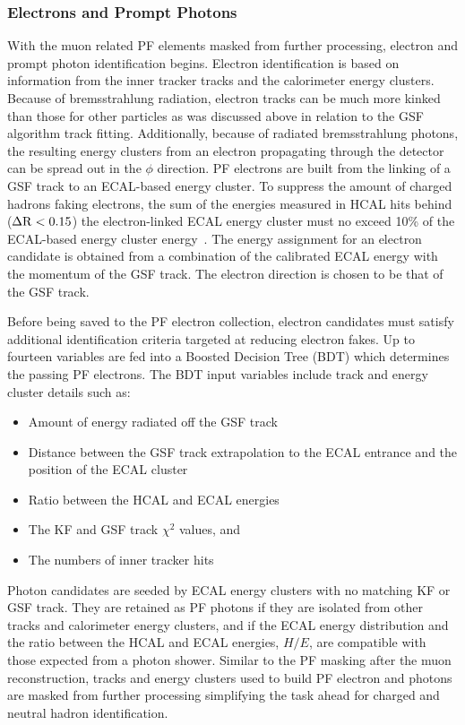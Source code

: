 \subsubsection{Electrons and Prompt Photons}
With the muon related PF elements masked from further processing, electron and prompt photon
identification begins.
Electron identification is based on information from the inner tracker tracks and the calorimeter
energy clusters. Because of bremsstrahlung radiation, electron tracks can be much more kinked
than those for other particles as was discussed above in relation to the GSF algorithm track
fitting. Additionally, because of radiated bremsstrahlung photons, the resulting energy clusters 
from an electron propagating through the detector can be spread out in the
$\phi$ direction. PF electrons are built from the linking of a GSF track to an
ECAL-based energy cluster. To suppress the amount of charged hadrons faking electrons, the 
sum of the energies measured in HCAL hits behind ($\Delta \mathrm{R} < 0.15$) 
the electron-linked ECAL energy cluster must no exceed 10\% of the ECAL-based 
energy cluster energy~\cite{Sirunyan:2017ulk}. The energy assignment for an electron candidate is obtained from a 
combination of the calibrated ECAL energy with the momentum of the GSF track. The electron 
direction is chosen to be that of the GSF track.

Before being saved to the PF electron collection, electron candidates must satisfy additional
identification criteria targeted at reducing electron fakes. Up to fourteen variables are
fed into a Boosted Decision Tree (BDT) which determines the passing PF electrons. The BDT
input variables include track and energy cluster details such as:
\begin{itemize}
\item Amount of energy radiated off the GSF track
\item Distance between the GSF track extrapolation to the ECAL entrance and the position of the ECAL cluster
\item Ratio between the HCAL and ECAL energies
\item The KF and GSF track $\chi^2$ values, and
\item The numbers of inner tracker hits
\end{itemize}

Photon candidates are seeded by ECAL energy clusters with no matching KF or GSF track.
They are retained as PF photons if they are isolated from other tracks and calorimeter energy clusters, 
and if the ECAL energy distribution and the ratio between the HCAL and ECAL energies, $H/E$, are 
compatible with those expected from a photon shower. Similar to the PF masking after the muon 
reconstruction, tracks and energy clusters used to
build PF electron and photons are masked from further processing simplifying the task ahead
for charged and neutral hadron identification.

